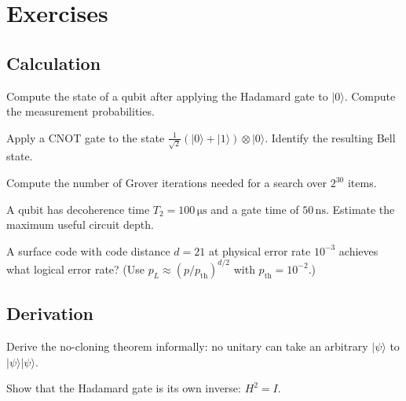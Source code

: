 \section{Exercises}

\subsection*{Calculation}

\begin{exercise}
Compute the state of a qubit after applying the Hadamard gate to $|0\rangle$. Compute the measurement probabilities.
\end{exercise}

\begin{exercise}
Apply a CNOT gate to the state $\frac{1}{\sqrt{2}}(|0\rangle + |1\rangle) \otimes |0\rangle$. Identify the resulting Bell state.
\end{exercise}

\begin{exercise}
Compute the number of Grover iterations needed for a search over $2^{30}$ items.
\end{exercise}

\begin{exercise}
A qubit has decoherence time $T_2 = 100\,\si{\micro\second}$ and a gate time of $50\,\si{\nano\second}$. Estimate the maximum useful circuit depth.
\end{exercise}

\begin{exercise}
A surface code with code distance $d = 21$ at physical error rate $10^{-3}$ achieves what logical error rate? (Use $p_L \approx (p/p_{\mathrm{th}})^{d/2}$ with $p_{\mathrm{th}} = 10^{-2}$.)
\end{exercise}

\subsection*{Derivation}

\begin{exercise}
Derive the no-cloning theorem informally: no unitary can take an arbitrary $|\psi\rangle$ to $|\psi\rangle |\psi\rangle$.
\end{exercise}

\begin{exercise}
Show that the Hadamard gate is its own inverse: $H^2 = I$.
\end{exercise}

